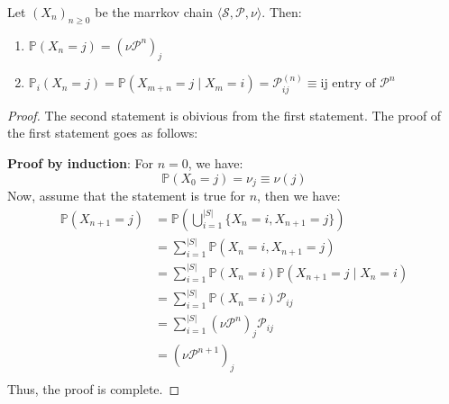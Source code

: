 \begin{theorem}
    Let \({(X_n)}_{n \geq 0}\) be the marrkov chain \(\langle \mathcal{S} , \mathcal{P} , \nu \rangle\).
    Then:
    \begin{enumerate}
        \item \(\mathbb{P} (X_n = j) = {(\nu \mathcal{P} ^{n})}_{j} \)
        \item \(\mathbb{P}_i (X_n = j) = \mathbb{P} \left( X_{m+n} = j \mid X_m = i \right) 
        = \mathcal{P}_{ij}^{(n)}\equiv \text{ij entry of } \mathcal{P} ^{n}\)
    \end{enumerate}
\end{theorem}
\begin{proof}
    The second statement is obivious from the first statement. The proof of the first statement goes as follows:

    \textbf{Proof by induction}: For \(n=0\), we have:
    \[
        \mathbb{P} (X_0 = j) = \nu _j \equiv \nu(j)  
    \]
    Now, assume that the statement is true for \(n\), then we have:
    \[
        \begin{aligned}
            \mathbb{P} (X_{n+1} = j) &= \mathbb{P} \left( 
                \bigcup_{i=1}^{ |S| } \{X_n = i , X_{n+1} = j\}
             \right) \\
                &= \sum_{i=1}^{ |S| } \mathbb{P} (X_n = i, X_{n+1} = j) \\
                &= \sum_{i=1}^{ |S| } \mathbb{P} (X_n = i) \mathbb{P} (X_{n+1} = j \mid X_n = i) \\
                &= \sum_{i=1}^{ |S| } \mathbb{P} (X_n = i) \mathcal{P}_{ij} \\
                &= \sum_{i=1}^{ |S| } {(\nu \mathcal{P}^n)}_j \mathcal{P}_{ij} \\
                &= {(\nu \mathcal{P}^{n+1})}_j \\
        \end{aligned}
    \]
    Thus, the proof is complete.
\end{proof}

